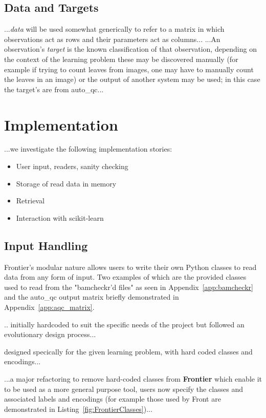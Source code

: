 \subsection{Data and Targets}

...\textit{data} will be used somewhat generically to refer to a matrix in which
observations act as rows and their parameters act as columns...
...An observation's \textit{target} is the known classification of that
observation, depending on the context of the learning problem these may be
discovered manually (for example if trying to count leaves from images, one may
have to manually count the leaves in an image) or the output of another system
may be used; in this case the target's are from auto\_qc...

\section{Implementation}
...we investigate the following implementation stories:

\begin{itemize}
    \item User input, readers, sanity checking
    \item Storage of read data in memory
    \item Retrieval
    \item Interaction with scikit-learn
\end{itemize}


\subsection{Input Handling}

Frontier's modular nature allows users to write their own Python classes to read
data from any form of input. Two examples of which are the provided classes used
to read from the "bamcheckr'd files" as seen in Appendix~\ref{app:bamcheckr} and
the auto\_qc output matrix briefly demonstrated in Appendix~\ref{app:aqc_matrix}.

.. initially hardcoded to suit the specific needs of the project but followed
an evolutionary design process...

designed specically for the given learning problem, with hard coded
classes and encodings...

...a major refactoring to remove hard-coded classes from \textbf{Frontier} which
enable it to be used as a more general purpose tool, users now specify the
classes and associated labels and encodings (for example those used by Front are
demonstrated in Listing~\ref{fig:FrontierClasses})...

